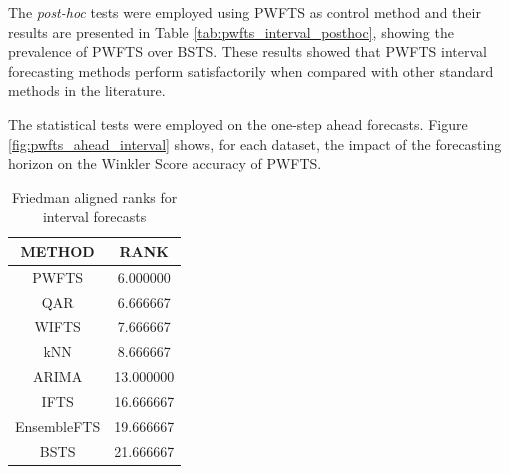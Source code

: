 The \textit{post-hoc} tests were employed using PWFTS as control method and their results are presented in Table \ref{tab:pwfts_interval_posthoc}, showing the prevalence of PWFTS over BSTS. These results showed that PWFTS interval forecasting methods perform satisfactorily when compared with other standard methods in the literature. 

The statistical tests were employed on the one-step ahead forecasts. Figure \ref{fig:pwfts_ahead_interval} shows, for each dataset, the impact of the forecasting horizon on the Winkler Score accuracy of PWFTS.


\begin{table}[htb]
    \caption{Average Winkler Score with $\alpha=.05$ for one step ahead interval forecasts}
    \label{tab:pwfts_interval_results}
\end{table}

\begin{table}[hbt]
    \centering
    \begin{tabular}{|c|c|}
\hline
       METHOD &       RANK \\
\hline
PWFTS &   6.000000 \\
QAR &   6.666667 \\
WIFTS &   7.666667 \\
kNN &   8.666667 \\
ARIMA &  13.000000 \\
IFTS &  16.666667 \\
EnsembleFTS &  19.666667 \\
BSTS &  21.666667 \\
\hline
\end{tabular}
    \caption{Friedman aligned ranks for interval forecasts }
    \label{tab:pwfts_interval_ranks}
\end{table}

